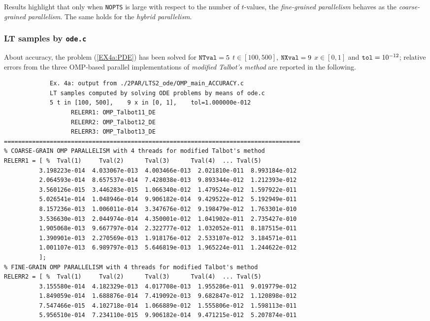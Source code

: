 \documentclass[a4paper,10pt]{report}%
\begin{document}
\noindent Results highlight that only when {\tt NOPTS} is large with respect to the number of
$t$-values, the {\em fine-grained parallelism} behaves as the {\em coarse-grained parallelism}.
The same holds for the {\em hybrid parallelism}.


\subsubsection{LT samples by {\tt ode.c}}
About accuracy, the problem (\ref{EX4a:PDE}) has been solved for ${\tt NTval}=5$ $t\in[100, 500]$,
${\tt NXval}=9$ $x\in[0,1]$ and ${\tt tol}=10^{-12}$; relative errors from the three OMP-based parallel
implementations of {\em modified Talbot's method} are reported in the following.
\begin{lstlisting}
             Ex. 4a: output from ./2PAR/LTS2_ode/OMP_main_ACCURACY.c
             LT samples computed by solving ODE problems by means of ode.c
             5 t in [100, 500],    9 x in [0, 1],    tol=1.000000e-012
                   RELERR1: OMP_Talbot11_DE
                   RELERR2: OMP_Talbot12_DE
                   RELERR3: OMP_Talbot13_DE
====================================================================================
% COARSE-GRAIN OMP PARALLELISM with 4 threads for modified Talbot's method
RELERR1 = [ %  Tval(1)     Tval(2)      Tval(3)      Tval(4)  ... Tval(5)
          3.198223e-014  4.033067e-013  4.003466e-013  2.021810e-011  8.993184e-012
          2.064593e-014  8.657537e-014  7.428038e-013  9.893344e-012  1.212393e-012
          3.560126e-015  3.446283e-015  1.066340e-012  1.479524e-012  1.597922e-011
          5.026541e-014  1.048946e-014  9.906182e-014  9.429522e-012  5.192949e-011
          8.157236e-013  1.006011e-014  3.347676e-012  9.198479e-012  1.763301e-010
          3.536630e-013  2.044974e-014  4.350001e-012  1.041902e-011  2.735427e-010
          1.905068e-013  9.667797e-014  2.322777e-012  1.032052e-011  8.187515e-011
          1.390901e-013  2.270569e-013  1.918176e-012  2.533107e-012  3.184571e-011
          1.001107e-013  6.989797e-013  5.646819e-013  1.965224e-011  1.244622e-012
          ];
% FINE-GRAIN OMP PARALLELISM with 4 threads for modified Talbot's method
RELERR2 = [ %  Tval(1)     Tval(2)      Tval(3)      Tval(4)  ... Tval(5)
          3.155580e-014  4.182329e-013  4.017708e-013  1.955286e-011  9.019779e-012
          1.849059e-014  1.688876e-014  7.419092e-013  9.682847e-012  1.120898e-012
          7.547466e-015  4.102718e-014  1.066889e-012  1.555806e-012  1.598113e-011
          5.956510e-014  7.234110e-015  9.906182e-014  9.471215e-012  5.207874e-011

\end{lstlisting}
\end{document}
